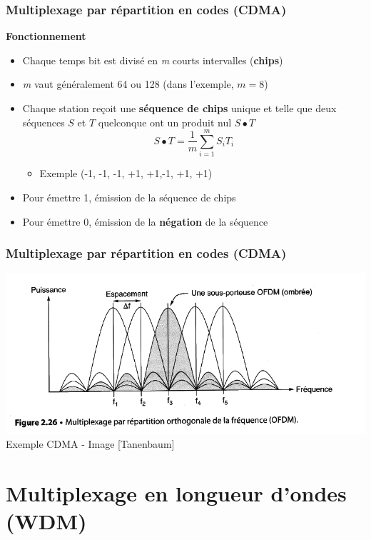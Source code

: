 \begin{frame}[fragile]
  \frametitle{Multiplexage par répartition en codes (CDMA)}
\textbf{Fonctionnement}
\begin{itemize}
	\item Chaque temps bit est divisé en \textit{m} courts intervalles
	(\textbf{chips})
	\item \textit{m} vaut généralement 64 ou 128 (dans l'exemple, $m=8$)
	\item Chaque station reçoit une \textbf{séquence de chips} unique et telle
	que deux séquences $S$ et $T$ quelconque ont un produit nul $S\bullet T$
	$$S\bullet T = \frac{1}{m}\sum^m_{i=1}S_iT_i$$
	\begin{itemize}
		\item Exemple (-1, -1, -1, +1, +1,-1, +1, +1)
	\end{itemize}
	\item Pour émettre 1, émission de la séquence de chips
	\item Pour émettre 0, émission de la \textbf{négation} de la séquence
\end{itemize}
\end{frame}

\begin{frame}[fragile]
  \frametitle{Multiplexage par répartition en codes (CDMA)}
\begin{center}
	\item \includegraphics[width=.7\linewidth]{img/2-26.png}\\
	{\scriptsize Exemple CDMA - Image [Tanenbaum]}
\end{center}
\end{frame}

\section{Multiplexage en longueur d'ondes (WDM)}

